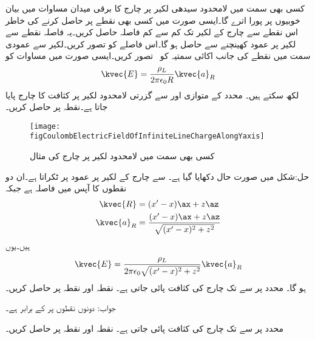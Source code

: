 کسی بھی سمت میں لامحدود سیدھی لکیر پر چارج کا برقی میدان مساوات  میں بیان خوبیوں پر پورا اترے گا۔ایسی صورت میں کسی بھی نقطے پر  حاصل کرنے کی خاطر اس نقطے سے چارج کے لکیر تک کم سے کم فاصلہ  حاصل کریں۔یہ فاصلہ نقطے سے لکیر پر عمود کھینچنے سے حاصل ہو گا۔اس فاصلے کو  تصور کریں۔لکیر سے عمودی سمت میں نقطے کی جانب اکائی سمتیہ  کو \arho   \, تصور کریں۔ایسی صورت میں مساوات  کو
\begin{align}\label{مساوات_کولومب_کسی_بھِی_سمت_میں_لامحدود_لکیر_رداسی_میدان_پیدا_کرتا_ہے}
\kvec{E}=\frac{\rho_L }{2 \pi \epsilon_0 R} \kvec{a}_R
\end{align}
لکھ سکتے ہیں۔
 محدد کے  متوازی اور  سے گزرتی لامحدود لکیر پر  کثافت کا چارج پایا جاتا ہے۔نقطہ  پر  حاصل کریں۔
\begin{figure}
\centering
\texttt{[image: figCoulombElectricFieldOfInfiniteLineChargeAlongYaxis]}
\caption{کسی بھی سمت میں لامحدود لکیر پر چارج کی مثال}
\label{شکل_کولومب_کسی_بھی_سمت_لامحدود_لکیر_پر_چارج_کا_میدان}
\end{figure}

حل:شکل  میں صورت حال دکھایا گیا ہے۔ سے چارج کے لکیر پر عمود  پر ٹکراتا ہے۔ان دو نقطوں کا آپس میں فاصلہ  ہے جبکہ 
\begin{align*}
\kvec{R}&=(x'-x)\ax+z\az\\
\kvec{a}_R&=\frac{(x'-x)\ax+z\az}{\sqrt{(x'-x)^2+z^2}}
\end{align*}
ہیں۔یوں
\begin{align*}
\kvec{E}=\frac{\rho_L}{2 \pi \epsilon_0 \sqrt{(x'-x)^2+z^2}} \kvec{a}_R
\end{align*}
ہو گا۔
 محدد پر  سے  تک  چارج کی کثافت پائی جاتی ہے۔ نقطہ  اور نقطہ    پر  حاصل کریں۔

جواب: دونوں نقطوں پر  کے برابر ہے۔

 محدد پر  سے  تک  چارج کی کثافت پائی جاتی ہے۔ نقطہ  اور نقطہ
    پر  حاصل کریں۔


